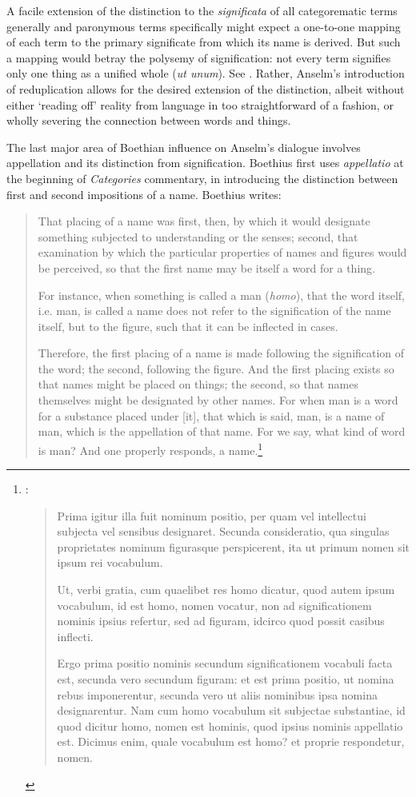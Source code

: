 \documentclass[]{article}
\begin{document}
A facile extension of the distinction to the \textit{significata} of all categorematic terms generally and paronymous terms specifically might expect a one-to-one mapping of each term to the primary significate from which its name is derived. But such a mapping would betray the polysemy of signification: not every term signifies only one thing as a unified whole (\textit{ut unum}). See \cite[DG ch. 12, 19]{Anselm1974}. Rather, Anselm's introduction of reduplication allows for the desired extension of the distinction, albeit without either `reading off' reality from language in too straightforward of a fashion, or wholly severing the connection between words and things.

The last major area of Boethian influence on Anselm's dialogue involves appellation and its distinction from signification. Boethius first uses \textit{appellatio} at the beginning of \textit{Categories} commentary, in introducing the distinction between first and second impositions of a name. Boethius writes:

\begin{quote}
That placing of a name was first, then, by which it would designate something subjected to understanding or the senses; second, that examination by which the particular properties of names and figures would be perceived, so that the first name may be itself a word for a thing. 

For instance, when something is called a man (\textit{homo}), that the word itself, i.e. man, is called a name does not refer to the signification of the name itself, but to the figure, such that it can be inflected in cases. 

Therefore, the first placing of a name is made following the signification of the word; the second, following the figure. And the first placing exists so that names might be placed on things; the second, so that names themselves might be designated by other names. For when man is a word for a substance placed under [it], that which is said, man, is a name of man, which is the appellation of that name. For we say, what kind of word is man? And one properly responds, a name.\footnote{\cite[BC 159BC]{BC}:
\begin{quote}
Prima igitur illa fuit nominum positio, per quam vel intellectui subjecta vel sensibus designaret. Secunda consideratio, qua singulas proprietates nominum figurasque perspicerent, ita ut primum nomen sit ipsum rei vocabulum. 

Ut, verbi gratia, cum quaelibet res homo dicatur, quod autem ipsum vocabulum, id est homo, nomen vocatur, non ad significationem nominis ipsius refertur, sed ad figuram, idcirco quod possit casibus inflecti. 

Ergo prima positio nominis secundum significationem vocabuli facta est, secunda vero secundum figuram: et est prima positio, ut nomina rebus imponerentur, secunda vero ut aliis nominibus ipsa nomina designarentur. Nam cum homo vocabulum sit subjectae substantiae, id quod dicitur homo, nomen est hominis, quod ipsius nominis appellatio est. Dicimus enim, quale vocabulum est homo? et proprie respondetur, nomen.
\end{quote}}
\end{quote}
\end{document}
